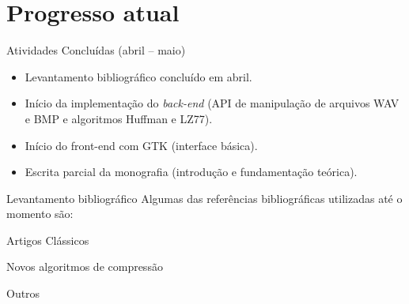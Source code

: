 \documentclass{beamer}
\begin{document}
\section{Progresso atual}
\begin{frame}{Atividades Conclu\'idas (abril -- maio)}
    \begin{itemize}
        \item Levantamento bibliogr\'afico conclu\'ido em abril.
        \item In\'icio da implementa\c{c}\~ao do \textit{back-end} (API de manipulação de arquivos WAV e BMP e algoritmos Huffman e LZ77).
        \item In\'icio do front-end com GTK (interface b\'asica).
        \item Escrita parcial da monografia (introdu\c{c}\~ao e fundamenta\c{c}\~ao te\'orica).
    \end{itemize}
\end{frame}

\begin{frame}{Levantamento bibliográfico}
    Algumas das referências bibliográficas utilizadas até o momento são:
    \begin{block}{Artigos Clássicos}
        \textcolor{blue} {
            ~\cite{hartley1928}
            ~\cite{shannon1948}
            ~\cite{huffman1952method}
            ~\cite{ziv1977universal}
            ~\cite{welch1984technique}
        }
    \end{block}
    \begin{block}{Novos algoritmos de compressão}
        \textcolor{blue} {
            ~\cite{alakuijala2016brotli}
            ~\cite{collet2016zstandard}
            ~\cite{wavenet}
        }
    \end{block}
    \begin{block}{Outros}
        \textcolor{blue} {
            ~\cite{salomon2007data}
            ~\cite{deutsch1996gzip}
        }
    \end{block}
\end{frame}
\end{document}
